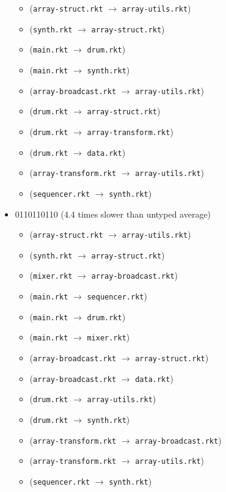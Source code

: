 \documentclass{article}
\newcommand{\mono}[1]{\texttt{#1}}
\begin{document}
\begin{itemize}
\begin{itemize}
  \item (\mono{array-struct.rkt} $\rightarrow$ \mono{array-utils.rkt})
  \item (\mono{synth.rkt} $\rightarrow$ \mono{array-struct.rkt})
  \item (\mono{main.rkt} $\rightarrow$ \mono{drum.rkt})
  \item (\mono{main.rkt} $\rightarrow$ \mono{synth.rkt})
  \item (\mono{array-broadcast.rkt} $\rightarrow$ \mono{array-utils.rkt})
  \item (\mono{drum.rkt} $\rightarrow$ \mono{array-struct.rkt})
  \item (\mono{drum.rkt} $\rightarrow$ \mono{array-transform.rkt})
  \item (\mono{drum.rkt} $\rightarrow$ \mono{data.rkt})
  \item (\mono{array-transform.rkt} $\rightarrow$ \mono{array-utils.rkt})
  \item (\mono{sequencer.rkt} $\rightarrow$ \mono{synth.rkt})
  \end{itemize}
\item 0110110110 (4.4 times slower than untyped average)
  \begin{itemize}
  \item (\mono{array-struct.rkt} $\rightarrow$ \mono{array-utils.rkt})
  \item (\mono{synth.rkt} $\rightarrow$ \mono{array-struct.rkt})
  \item (\mono{mixer.rkt} $\rightarrow$ \mono{array-broadcast.rkt})
  \item (\mono{main.rkt} $\rightarrow$ \mono{sequencer.rkt})
  \item (\mono{main.rkt} $\rightarrow$ \mono{drum.rkt})
  \item (\mono{main.rkt} $\rightarrow$ \mono{mixer.rkt})
  \item (\mono{array-broadcast.rkt} $\rightarrow$ \mono{array-struct.rkt})
  \item (\mono{array-broadcast.rkt} $\rightarrow$ \mono{data.rkt})
  \item (\mono{drum.rkt} $\rightarrow$ \mono{array-utils.rkt})
  \item (\mono{drum.rkt} $\rightarrow$ \mono{synth.rkt})
  \item (\mono{array-transform.rkt} $\rightarrow$ \mono{array-broadcast.rkt})
  \item (\mono{array-transform.rkt} $\rightarrow$ \mono{array-utils.rkt})
  \item (\mono{sequencer.rkt} $\rightarrow$ \mono{synth.rkt})

\end{itemize}
\end{itemize}
\end{document}
